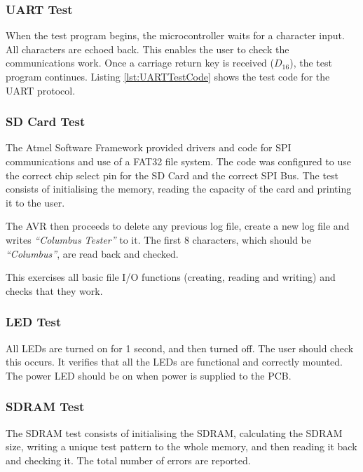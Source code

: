\subsubsection{UART Test}\label{UART:Test}
When the test program begins, the microcontroller waits for a character input. All characters are echoed back. This enables the user to check the communications work. Once a carriage return key is received ($D_{16}$), the test program continues. Listing \ref{lst:UARTTestCode} shows the test code for the UART protocol.




\subsubsection{SD Card Test}\label{SD:Test}
The Atmel Software Framework \citep{Atmel:ASF} provided drivers and code for SPI communications and use of a FAT32 file system. The code was configured to use the correct chip select pin for the SD Card and the correct SPI Bus. The test consists of initialising the memory, reading the capacity of the card and printing it to the user. 

The AVR then proceeds to delete any previous log file, create a new log file and writes \textit{``Columbus Tester''} to it. The first 8 characters, which should be \textit{``Columbus''}, are read back and checked.


This exercises all basic file I/O functions (creating, reading and writing) and checks that they work.

\subsubsection{LED Test}\label{LED:Test}
All LEDs are turned on for 1 second, and then turned off. The user should check this occurs. It verifies that all the LEDs are functional and correctly mounted. The power LED should be on when power is supplied to the PCB. 

\subsubsection{SDRAM Test}\label{SDRAM:Test}
The SDRAM test consists of initialising the SDRAM, calculating the SDRAM size, writing a unique test pattern to the whole memory, and then reading it back and checking it. The total number of errors are reported. 

